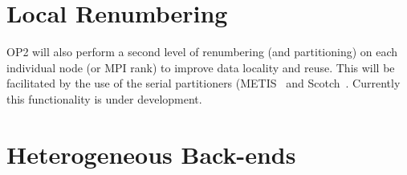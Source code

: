 \documentclass[11pt]{article}
\begin{document}
\section{Local Renumbering}\label{sec/localrenumbering}
OP2 will also perform a second level of renumbering (and partitioning) on each individual node (or MPI rank) to improve
data locality and reuse. This will be facilitated by the use of the serial partitioners (METIS~\cite{metis} and
Scotch~\cite{PTScotch}. Currently this functionality is under development.




\newpage
\section{Heterogeneous Back-ends}\label{sec/heterogeneous}
\end{document}
